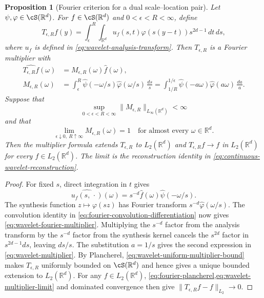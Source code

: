 \documentclass[11pt,twoside]{article}
\newcommand{\R}{\mathbb R}
\newtheorem{proposition}[theorem]{Proposition}
\theoremstyle{definition}
\theoremstyle{remark}
\begin{document}
\begin{proposition}[Fourier criterion for a dual scale--location pair]
\label{prop:fourier-dual-wavelet-criterion}
Let $\psi,\varphi\in\cS(\R^d)$. For $f\in\cS(\R^d)$ and
$0<\epsilon<R<\infty$, define
\begin{equation}
 T_{\epsilon,R}f(y)
 =\int_\epsilon^R\int_{\R^d}
 u_f(s,t)\varphi(s(y-t))s^{2d-1}\,dt\,ds,
 \label{eq:truncated-wavelet-reconstruction}
\end{equation}
where $u_f$ is defined in \cref{eq:wavelet-analysis-transform}. Then
$T_{\epsilon,R}$ is a Fourier multiplier with
\begin{align}
 \widehat{T_{\epsilon,R}f}(\omega)
 &=M_{\epsilon,R}(\omega)\widehat f(\omega),
 \label{eq:wavelet-fourier-multiplier}\\
 M_{\epsilon,R}(\omega)
 &=\int_\epsilon^R
 \widehat\psi(-\omega/s)\widehat\varphi(\omega/s)\,\frac{ds}{s}
 =\int_{1/R}^{1/\epsilon}
 \widehat\psi(-a\omega)\widehat\varphi(a\omega)\,\frac{da}{a}.
 \label{eq:wavelet-multiplier}
\end{align}
Suppose that
\begin{equation}
 \sup_{0<\epsilon<R<\infty}
 \|M_{\epsilon,R}\|_{L_\infty(\R^d)}<\infty
 \label{eq:wavelet-uniform-multiplier-bound}
\end{equation}
and that
\begin{equation}
 \lim_{\epsilon\downarrow0,\ R\uparrow\infty}
 M_{\epsilon,R}(\omega)=1
 \quad\text{for almost every $\omega\in\R^d$.}
 \label{eq:wavelet-multiplier-limit}
\end{equation}
Then the multiplier formula extends $T_{\epsilon,R}$ to $L_2(\R^d)$ and
$T_{\epsilon,R}f\to f$ in $L_2(\R^d)$ for every $f\in L_2(\R^d)$. The limit
is the reconstruction identity in \cref{eq:continuous-wavelet-reconstruction}.
\end{proposition}

\begin{proof}
For fixed $s$, direct integration in $t$ gives
\begin{equation}
 \widehat{u_f(s,\,\cdot)}(\omega)
 =s^{-d}\widehat f(\omega)\widehat\psi(-\omega/s).
 \label{eq:wavelet-analysis-fourier-transform}
\end{equation}
The synthesis function $z\mapsto\varphi(sz)$ has Fourier transform
$s^{-d}\widehat\varphi(\omega/s)$. The convolution identity in
\cref{eq:fourier-convolution-differentiation} now gives
\cref{eq:wavelet-fourier-multiplier}. Multiplying the $s^{-d}$ factor from
the analysis transform by the $s^{-d}$ factor from the synthesis kernel
cancels the $s^{2d}$ factor in $s^{2d-1}ds$, leaving $ds/s$. The substitution
$a=1/s$ gives the second expression in \cref{eq:wavelet-multiplier}.
By Plancherel, \cref{eq:wavelet-uniform-multiplier-bound} makes
$T_{\epsilon,R}$ uniformly bounded on $\cS(\R^d)$ and hence gives a unique
bounded extension to $L_2(\R^d)$. For any $f\in L_2(\R^d)$,
\cref{eq:fourier-plancherel,eq:wavelet-multiplier-limit} and dominated
convergence then give $\|T_{\epsilon,R}f-f\|_{L_2}\to0$.
\end{proof}
\end{document}
